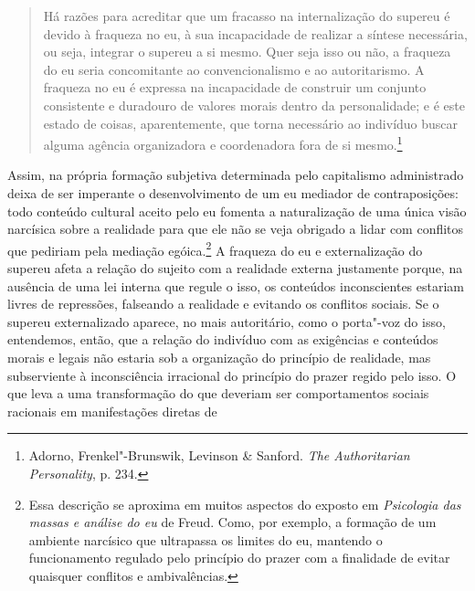 \begin{quote}
Há razões para acreditar que um fracasso na internalização do supereu é
devido à fraqueza no eu, à sua incapacidade de realizar a síntese
necessária, ou seja, integrar o supereu a si mesmo. Quer seja isso ou
não, a fraqueza do eu seria concomitante ao convencionalismo e ao
autoritarismo. A fraqueza no eu é expressa na incapacidade de construir
um conjunto consistente e duradouro de valores morais dentro da
personalidade; e é este estado de coisas, aparentemente, que torna
necessário ao indivíduo buscar alguma agência organizadora e
coordenadora fora de si mesmo.\footnote{Adorno, Frenkel"-Brunswik,
  Levinson \& Sanford. \emph{The Authoritarian Personality}, p. 234.}
\end{quote}

Assim, na própria formação subjetiva determinada pelo capitalismo
administrado deixa de ser imperante o desenvolvimento de um eu mediador
de contraposições: todo conteúdo cultural aceito pelo eu fomenta a
naturalização de uma única visão narcísica sobre a realidade para que
ele não se veja obrigado a lidar com conflitos que pediriam pela
mediação egóica.\footnote{Essa descrição se aproxima em muitos aspectos
  do exposto em \emph{Psicologia das massas e análise do eu} de Freud.
  Como, por exemplo, a formação de um ambiente narcísico que ultrapassa
  os limites do eu, mantendo o funcionamento regulado pelo princípio do
  prazer com a finalidade de evitar quaisquer conflitos e ambivalências.}
A fraqueza do eu e externalização do supereu afeta a relação do sujeito
com a realidade externa justamente porque, na ausência de uma lei
interna que regule o isso, os conteúdos inconscientes estariam livres de
repressões, falseando a realidade e evitando os conflitos sociais. Se o
supereu externalizado aparece, no mais autoritário, como o porta"-voz do
isso, entendemos, então, que a relação do indivíduo com as exigências e
conteúdos morais e legais não estaria sob a organização do princípio de
realidade, mas subserviente à inconsciência irracional do princípio do
prazer regido pelo isso. O que leva a uma transformação do que deveriam
ser comportamentos sociais racionais em manifestações diretas de
